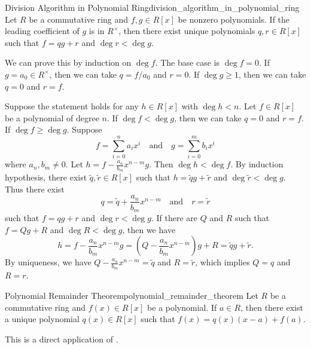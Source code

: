 \begin{proposition}{Division Algorithm in Polynomial Ring}{division_algorithm_in_polynomial_ring}
    Let $R$ be a commutative ring and $f,g\in R[x]$ be nonzero polynomials. If the leading coefficient of $g$ is in $R^\times$, then there exist unique polynomials $q,r\in R[x]$ such that $f=qg+r$ and $\deg r<\deg g$.
\end{proposition}
\begin{prf}
    We can prove this by induction on $\deg f$. The base case is $\deg f=0$. If $g=a_0\in R^\times$, then we can take $q=f/a_0$ and $r=0$. If $\deg g\ge 1$, then we can take $q=0$ and $r=f$.

    Suppose the statement holds for any $h\in R[x]$ with $\deg h < n$. Let $f\in R[x]$ be a polynomial of degree $n$. If $\deg f<\deg g$, then we can take $q=0$ and $r=f$. If $\deg f\ge \deg g$. Suppose
    \[
        f=\sum_{i=0}^n a_ix^i\quad\text{and}\quad g=\sum_{i=0}^m b_ix^i
    \]
    where $a_n,b_m\ne 0$. Let $h=f-\frac{a_n}{b_m} x^{n-m}g$. Then $\deg h<\deg f$. By induction hypothesis, there exist $\tilde{q},\tilde{r}\in R[x]$ such that $h=\tilde{q}g+\tilde{r}$ and $\deg \tilde{r}<\deg g$. Thus there exist 
    \[
        q=\tilde{q}+\frac{a_n}{b_m} x^{n-m}\quad\text{and}\quad r=\tilde{r}
    \]
    such that $f=qg+r$ and $\deg r<\deg g$. If there are $Q$ and $R$ such that $f=Qg+R$ and $\deg R<\deg g$, then we have
    \[
    h=f-\frac{a_n}{b_m} x^{n-m}g=\left(Q-\frac{a_n}{b_m} x^{n-m}\right)g+R=\tilde{q}g+\tilde{r}.
    \]
    By uniqueness, we have $Q-\frac{a_n}{b_m} x^{n-m}=\tilde{q}$ and $R=\tilde{r}$, which implies $Q=q$ and $R=r$.
\end{prf}

\begin{corollary}{Polynomial Remainder Theorem}{polynomial_remainder_theorem}
    Let $R$ be a commutative ring and $f(x)\in R[x]$ be a polynomial. If $a\in R$, then there exist a unique polynomial $q(x)\in R[x]$ such that $f(x)=q(x)(x-a)+f(a)$.
\end{corollary}
\begin{prf}
    This is a direct application of .
\end{prf}


